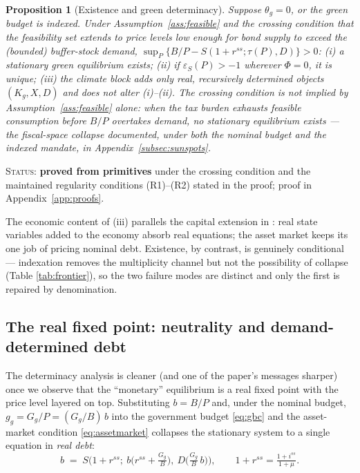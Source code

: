 \documentclass[12pt]{article}
\newtheorem{proposition}{Proposition}
\newcommand{\Sfun}{S}
\begin{document}
\begin{proposition}[Existence and green determinacy]\label{prop:determinacy}
Suppose $\theta_g=0$, or the green budget is indexed. Under
Assumption~\ref{ass:feasible} and the crossing condition that the
feasibility set extends to price levels low enough for bond supply to exceed
the (bounded) buffer-stock demand, $\sup_{P}\{B/P - \Sfun(1+r^{ss};\tau(P),D)\}>0$:
(i) a stationary green equilibrium exists;
(ii) if $\varepsilon_S(P)>-1$ wherever $\Phi=0$, it is unique;
(iii) the climate block adds only real, recursively determined objects
$(K_g, X, D)$ and does not alter (i)--(ii).
The crossing condition is not implied by Assumption~\ref{ass:feasible} alone:
when the tax burden exhausts feasible consumption before $B/P$ overtakes
demand, no stationary equilibrium exists --- the fiscal-space collapse
documented, under both the nominal budget and the indexed mandate, in
Appendix~\ref{subsec:sunspots}.
\end{proposition}
\noindent\textsc{Status:} \textbf{proved from primitives} under the crossing
condition and the maintained regularity conditions (R1)--(R2) stated in the
proof; proof in Appendix~\ref{app:proofs}.

The economic content of (iii) parallels the capital extension in
\citet{hagedorn2026dtpl}: real state variables added to the economy absorb
real equations; the asset market keeps its one job of pricing nominal debt.
Existence, by contrast, is genuinely conditional --- indexation removes the
multiplicity channel but not the possibility of collapse (Table
\ref{tab:frontier}), so the two failure modes are distinct and only the
first is repaired by denomination.

\subsection{The real fixed point: neutrality and demand-determined debt}
\label{subsec:neutrality}

The determinacy analysis is cleaner (and one of the paper's messages
sharper) once we observe that the ``monetary'' equilibrium is a real
fixed point with the price level layered on top. Substituting $b=B/P$ and,
under the nominal budget, $g_g=G_g/P=(G_g/B)\,b$ into the government budget
\eqref{eq:gbc} and the asset-market condition \eqref{eq:assetmarket}
collapses the stationary system to a single equation in \emph{real debt}:
\begin{equation}
b \;=\; \Sfun\!\Big(1+r^{ss};\ b\big(r^{ss}+\tfrac{G_g}{B}\big),\
D\big(\tfrac{G_g}{B}\,b\big)\Big),
\qquad 1+r^{ss}=\tfrac{1+i^{ss}}{1+\mu}.
\label{eq:realfp}
\end{equation}
\end{document}
